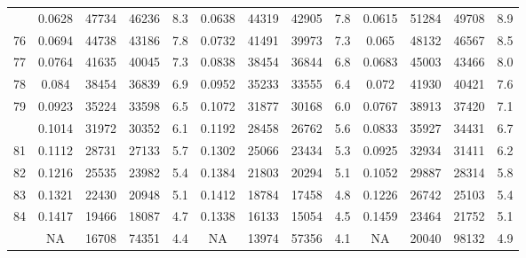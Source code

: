 \documentclass[
  14pt,
]{article}
\begin{document}
\begin{longtable}[t]{lcccccccccccc}
\addlinespace
75 & 0.0628 & 47734 & 46236 & 8.3 & 0.0638 & 44319 & 42905 & 7.8 & 0.0615 & 51284 & 49708 & 8.9\\
76 & 0.0694 & 44738 & 43186 & 7.8 & 0.0732 & 41491 & 39973 & 7.3 & 0.065 & 48132 & 46567 & 8.5\\
77 & 0.0764 & 41635 & 40045 & 7.3 & 0.0838 & 38454 & 36844 & 6.8 & 0.0683 & 45003 & 43466 & 8.0\\
78 & 0.084 & 38454 & 36839 & 6.9 & 0.0952 & 35233 & 33555 & 6.4 & 0.072 & 41930 & 40421 & 7.6\\
79 & 0.0923 & 35224 & 33598 & 6.5 & 0.1072 & 31877 & 30168 & 6.0 & 0.0767 & 38913 & 37420 & 7.1\\
\addlinespace
80 & 0.1014 & 31972 & 30352 & 6.1 & 0.1192 & 28458 & 26762 & 5.6 & 0.0833 & 35927 & 34431 & 6.7\\
81 & 0.1112 & 28731 & 27133 & 5.7 & 0.1302 & 25066 & 23434 & 5.3 & 0.0925 & 32934 & 31411 & 6.2\\
82 & 0.1216 & 25535 & 23982 & 5.4 & 0.1384 & 21803 & 20294 & 5.1 & 0.1052 & 29887 & 28314 & 5.8\\
83 & 0.1321 & 22430 & 20948 & 5.1 & 0.1412 & 18784 & 17458 & 4.8 & 0.1226 & 26742 & 25103 & 5.4\\
84 & 0.1417 & 19466 & 18087 & 4.7 & 0.1338 & 16133 & 15054 & 4.5 & 0.1459 & 23464 & 21752 & 5.1\\
\addlinespace
85 & NA & 16708 & 74351 & 4.4 & NA & 13974 & 57356 & 4.1 & NA & 20040 & 98132 & 4.9\\*
\end{longtable}
\end{document}

